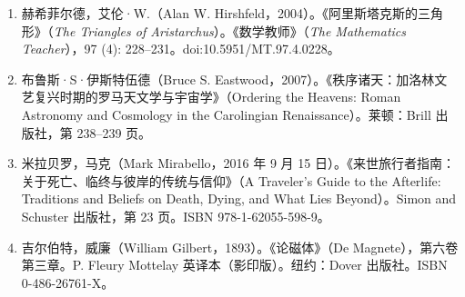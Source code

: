 \begin{enumerate}
\item 赫希菲尔德，艾伦·W.（Alan W. Hirshfeld，2004）。《阿里斯塔克斯的三角形》（\emph{The Triangles of Aristarchus}）。《数学教师》（\emph{The Mathematics Teacher}），97 (4): 228–231。doi:10.5951/MT.97.4.0228。  
\item 布鲁斯·S·伊斯特伍德（Bruce S. Eastwood，2007）。《秩序诸天：加洛林文艺复兴时期的罗马天文学与宇宙学》（Ordering the Heavens: Roman Astronomy and Cosmology in the Carolingian Renaissance）。莱顿：Brill 出版社，第 238–239 页。  
\item 米拉贝罗，马克（Mark Mirabello，2016 年 9 月 15 日）。《来世旅行者指南：关于死亡、临终与彼岸的传统与信仰》（A Traveler’s Guide to the Afterlife: Traditions and Beliefs on Death, Dying, and What Lies Beyond）。Simon and Schuster 出版社，第 23 页。ISBN 978-1-62055-598-9。  
\item 吉尔伯特，威廉（William Gilbert，1893）。《论磁体》（De Magnete），第六卷第三章。P. Fleury Mottelay 英译本（影印版）。纽约：Dover 出版社。ISBN 0-486-26761-X。
\end{enumerate}



